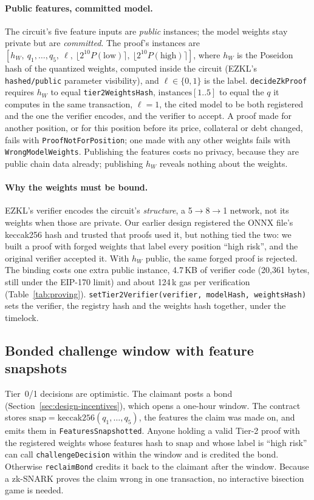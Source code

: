 \documentclass[sigconf,nonacm]{acmart}
\newcommand{\code}[1]{\texttt{\smaller #1}}
\begin{document}
\paragraph{Public features, committed model.} The circuit's five feature inputs are \emph{public} instances; the model weights stay private but are \emph{committed}. The proof's instances are $[h_W,\ q_1,\dots,q_5,\ \ell,\ \lfloor 2^{10}P(\text{low})\rceil,\ \lfloor 2^{10}P(\text{high})\rceil]$, where $h_W$ is the Poseidon hash of the quantized weights, computed inside the circuit (EZKL's \code{hashed/public} parameter visibility), and $\ell\in\{0,1\}$ is the label. \code{decideZkProof} requires $h_W$ to equal \code{tier2WeightsHash}, $\text{instances}[1..5]$ to equal the $q$ it computes in the same transaction, $\ell=1$, the cited model to be both registered and the one the verifier encodes, and the verifier to accept. A proof made for another position, or for this position before its price, collateral or debt changed, fails with \code{ProofNotForPosition}; one made with any other weights fails with \code{WrongModelWeights}. Publishing the features costs no privacy, because they are public chain data already; publishing $h_W$ reveals nothing about the weights.

\paragraph{Why the weights must be bound.} EZKL's verifier encodes the circuit's \emph{structure}, a 5$\to$8$\to$1 network, not its weights when those are private. Our earlier design registered the ONNX file's keccak256 hash and trusted that proofs used it, but nothing tied the two: we built a proof with forged weights that label every position ``high risk'', and the original verifier accepted it. With $h_W$ public, the same forged proof is rejected. The binding costs one extra public instance, 4.7\,KB of verifier code (20,361 bytes, still under the EIP-170 limit) and about 124\,k gas per verification (Table~\ref{tab:proving}). \code{setTier2Verifier(verifier, modelHash, weightsHash)} sets the verifier, the registry hash and the weights hash together, under the timelock.

\subsection{Bonded challenge window with feature snapshots}
\label{sec:design-challenge}

Tier~0/1 decisions are optimistic. The claimant posts a bond (Section~\ref{sec:design-incentives}), which opens a one-hour window. The contract stores $\mathrm{snap} = \mathrm{keccak256}(q_1,\dots,q_5)$, the features the claim was made on, and emits them in \code{FeaturesSnapshotted}. Anyone holding a valid Tier-2 proof with the registered weights whose features hash to $\mathrm{snap}$ and whose label is ``high risk'' can call \code{challengeDecision} within the window and is credited the bond. Otherwise \code{reclaimBond} credits it back to the claimant after the window. Because a zk-SNARK proves the claim wrong in one transaction, no interactive bisection game is needed.
\end{document}
